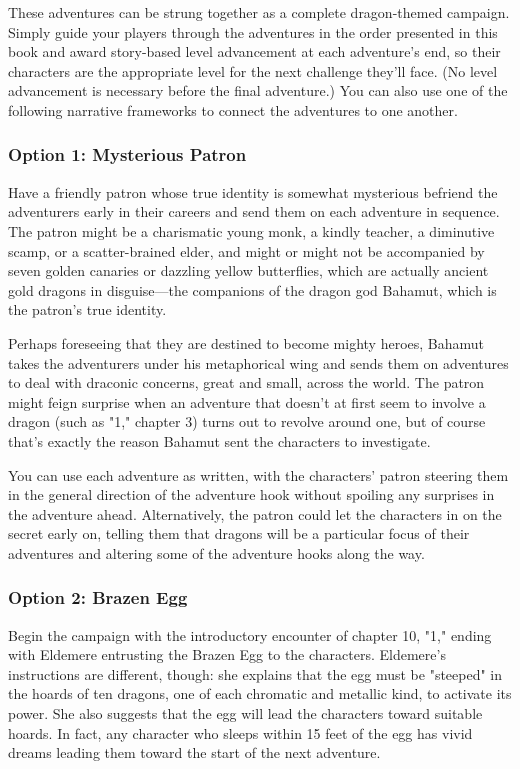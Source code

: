 \documentclass[letterpaper, 11pt, twocolumn]{dndbook}
\begin{document}
These adventures can be strung together as a complete dragon-themed campaign. Simply guide your players through the adventures in the order presented in this book and award story-based level advancement at each adventure's end, so their characters are the appropriate level for the next challenge they'll face. (No level advancement is necessary before the final adventure.) You can also use one of the following narrative frameworks to connect the adventures to one another.

\subsubsection{Option 1: Mysterious Patron}

Have a friendly patron whose true identity is somewhat mysterious befriend the adventurers early in their careers and send them on each adventure in sequence. The patron might be a charismatic young monk, a kindly teacher, a diminutive scamp, or a scatter-brained elder, and might or might not be accompanied by seven golden canaries or dazzling yellow butterflies, which are actually ancient gold dragons in disguise---the companions of the dragon god Bahamut, which is the patron's true identity.

Perhaps foreseeing that they are destined to become mighty heroes, Bahamut takes the adventurers under his metaphorical wing and sends them on adventures to deal with draconic concerns, great and small, across the world. The patron might feign surprise when an adventure that doesn't at first seem to involve a dragon (such as "1," chapter 3) turns out to revolve around one, but of course that's exactly the reason Bahamut sent the characters to investigate.

You can use each adventure as written, with the characters' patron steering them in the general direction of the adventure hook without spoiling any surprises in the adventure ahead. Alternatively, the patron could let the characters in on the secret early on, telling them that dragons will be a particular focus of their adventures and altering some of the adventure hooks along the way.

\subsubsection{Option 2: Brazen Egg}

Begin the campaign with the introductory encounter of chapter 10, "1," ending with Eldemere entrusting the Brazen Egg to the characters. Eldemere's instructions are different, though: she explains that the egg must be "steeped" in the hoards of ten dragons, one of each chromatic and metallic kind, to activate its power. She also suggests that the egg will lead the characters toward suitable hoards. In fact, any character who sleeps within 15 feet of the egg has vivid dreams leading them toward the start of the next adventure.
\end{document}
